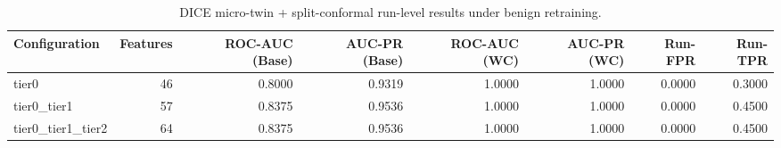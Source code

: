 \begin{table}[t]
\centering
\caption{DICE micro-twin + split-conformal run-level results under benign retraining.}
\label{tab:dice_full_overall}
\footnotesize
\begin{tabular}{lrrrrrrr}
\toprule
Configuration & Features & ROC-AUC (Base) & AUC-PR (Base) & ROC-AUC (WC) & AUC-PR (WC) & Run-FPR & Run-TPR \\
\midrule
tier0 & 46 & 0.8000 & 0.9319 & 1.0000 & 1.0000 & 0.0000 & 0.3000 \\
tier0_tier1 & 57 & 0.8375 & 0.9536 & 1.0000 & 1.0000 & 0.0000 & 0.4500 \\
tier0_tier1_tier2 & 64 & 0.8375 & 0.9536 & 1.0000 & 1.0000 & 0.0000 & 0.4500 \\
\bottomrule
\end{tabular}

\end{table}
